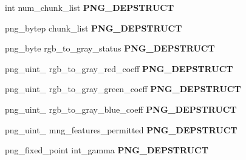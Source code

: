 \begin{DoxyCompactItemize}
\item 
\hypertarget{structpng__struct__def_add543e6ab78e61d3e335228465e47228}{int num\-\_\-chunk\-\_\-list {\bfseries P\-N\-G\-\_\-\-D\-E\-P\-S\-T\-R\-U\-C\-T}}\label{structpng__struct__def_add543e6ab78e61d3e335228465e47228}

\item 
\hypertarget{structpng__struct__def_ac7a71cbbcb1033ed0aedeab6ca1ab5c7}{png\-\_\-bytep chunk\-\_\-list {\bfseries P\-N\-G\-\_\-\-D\-E\-P\-S\-T\-R\-U\-C\-T}}\label{structpng__struct__def_ac7a71cbbcb1033ed0aedeab6ca1ab5c7}

\item 
\hypertarget{structpng__struct__def_ade2763e7e0af521453f0b0a449be4abb}{png\-\_\-byte rgb\-\_\-to\-\_\-gray\-\_\-status {\bfseries P\-N\-G\-\_\-\-D\-E\-P\-S\-T\-R\-U\-C\-T}}\label{structpng__struct__def_ade2763e7e0af521453f0b0a449be4abb}

\item 
\hypertarget{structpng__struct__def_ad5754034c81fd23959c0265e104306a5}{png\-\_\-uint\-\_ rgb\-\_\-to\-\_\-gray\-\_\-red\-\_\-coeff {\bfseries P\-N\-G\-\_\-\-D\-E\-P\-S\-T\-R\-U\-C\-T}}\label{structpng__struct__def_ad5754034c81fd23959c0265e104306a5}

\item 
\hypertarget{structpng__struct__def_ab489429099ed66fe88c1c17353787c0c}{png\-\_\-uint\-\_ rgb\-\_\-to\-\_\-gray\-\_\-green\-\_\-coeff {\bfseries P\-N\-G\-\_\-\-D\-E\-P\-S\-T\-R\-U\-C\-T}}\label{structpng__struct__def_ab489429099ed66fe88c1c17353787c0c}

\item 
\hypertarget{structpng__struct__def_a1f8930c1eb30f91954fdad638d588682}{png\-\_\-uint\-\_ rgb\-\_\-to\-\_\-gray\-\_\-blue\-\_\-coeff {\bfseries P\-N\-G\-\_\-\-D\-E\-P\-S\-T\-R\-U\-C\-T}}\label{structpng__struct__def_a1f8930c1eb30f91954fdad638d588682}

\item 
\hypertarget{structpng__struct__def_a37bd0a51a2f053d223d1a5c2cfad4f29}{png\-\_\-uint\-\_ mng\-\_\-features\-\_\-permitted {\bfseries P\-N\-G\-\_\-\-D\-E\-P\-S\-T\-R\-U\-C\-T}}\label{structpng__struct__def_a37bd0a51a2f053d223d1a5c2cfad4f29}

\item 
\hypertarget{structpng__struct__def_afd305e8f99ae00c593b528fef17a27d6}{png\-\_\-fixed\-\_\-point int\-\_\-gamma {\bfseries P\-N\-G\-\_\-\-D\-E\-P\-S\-T\-R\-U\-C\-T}}\label{structpng__struct__def_afd305e8f99ae00c593b528fef17a27d6}


\end{DoxyCompactItemize}
